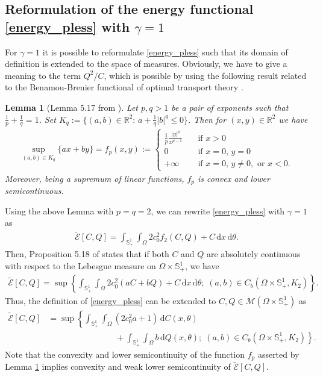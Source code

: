 \documentclass{article}
\numberwithin{equation}{section}
\newtheorem{lemma}{Lemma}%
\def\d{\,\mathrm{d}}
\begin{document}
\subsection{Reformulation of the energy functional \eqref{energy_pless} with $\gamma=1$}\label{ssec:ReformE}
For $\gamma=1$ it is possible to reformulate \eqref{energy_pless} such that its domain of definition is extended to the space
of measures. Obviously, we have to give a meaning to the term $Q^2/C$, which is possible by using the following
result related to the Benamou-Brenier functional of optimal transport theory \cite{santambrogio2015optimal}.
\vspace{2mm}

\begin{lemma}[Lemma 5.17 from \cite{santambrogio2015optimal}] \label{lem:BB}
Let $p, q>1$ be a pair of exponents such that $\frac{1}{p}+\frac{1}{q}=1$.
Set $K_q:=\{(a,b)\in \mathbb{R}^2:\, a+\frac{1}{q}|b|^q\leq 0\}$. Then for $(x,y)\in\mathbb{R}^2$ we have
\begin{align*}
\sup_{(a,b)\in K_q} \{ax+by\}=f_p(x,y):=
\begin{cases}
\frac{1}{p}\frac{|y|^p}{x^{p-1}}\quad &\text{if }x>0\\
0\quad&\text{if }x=0,\, y=0\\
+\infty\quad &\text{if } x=0,\, y\neq 0,\text{ or } x<0.
\end{cases}
\end{align*}
Moreover, being a supremum of linear functions, $f_p$ is convex and lower semicontinuous.
\end{lemma}

\noindent
Using the above Lemma with $p=q=2$, we can rewrite \eqref{energy_pless} with $\gamma=1$ as
\begin{align*}
   \widetilde{\mathcal{E}}[C,Q] = \int_{\mathbb{S}_+^1} \int_\Omega 2 c_0^2 f_2(C, Q) + C \d x \d\theta.
\end{align*}
Then, Proposition 5.18 of \cite{santambrogio2015optimal} states that if both $C$ and $Q$ are absolutely continuous with respect to
the Lebesgue measure on $\Omega\times \mathbb{S}_+^1$, we have
\begin{align*}
   \widetilde{\mathcal{E}}[C,Q] = \sup \left\{ \int_{\mathbb{S}_+^1} \int_\Omega 2 c_0^2 (aC + bQ) + C \d x \d\theta;\; (a,b)\in C_b(\Omega\times\mathbb{S}_+^1, K_2) \right\}.
\end{align*}
Thus, the definition of \eqref{energy_pless} can be extended to $C, Q\in \mathcal{M}(\Omega\times\mathbb{S}_+^1)$ as
\begin{align} \label{enM}
   \widetilde{\mathcal{E}}[C,Q] &= \sup \left\{ \int_{\mathbb{S}_+^1} \int_\Omega (2 c_0^2 a + 1) \d C(x,\theta)\right.\nonumber\\ &\qquad \qquad \qquad \qquad + \int_{\mathbb{S}_+^1} \int_\Omega b \d Q(x,\theta);\;
     \left. (a,b)\in C_b(\Omega\times\mathbb{S}_+^1, K_2) \right\}.
\end{align}
Note that the convexity and lower semicontinuity of the function $f_p$ asserted by Lemma \ref{lem:BB}
implies convexity and weak lower semicontinuity of $\widetilde{\mathcal{E}}[C,Q]$.
\end{document}
